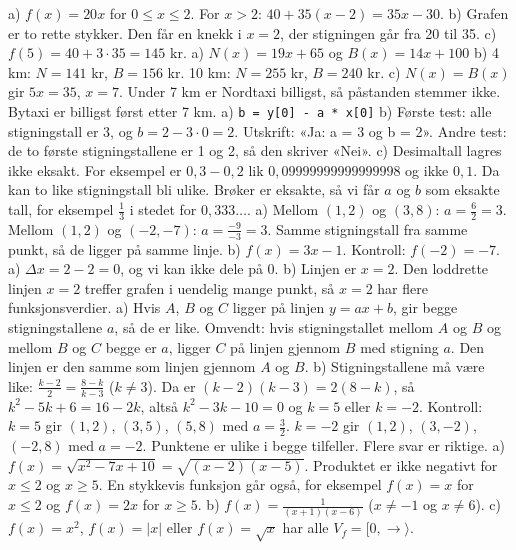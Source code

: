  a) $f(x) = 20x$ for $0 \le x \le 2$. For $x > 2$: $40 + 35(x - 2) = 35x - 30$.
b) Grafen er to rette stykker. Den får en knekk i $x = 2$, der stigningen går fra 20 til 35.
c) $f(5) = 40 + 3 \cdot 35 = 145$ kr.
 a) $N(x) = 19x + 65$ og $B(x) = 14x + 100$
b) 4 km: $N = 141$ kr, $B = 156$ kr. 10 km: $N = 255$ kr, $B = 240$ kr.
c) $N(x) = B(x)$ gir $5x = 35$, $x = 7$. Under 7 km er Nordtaxi billigst, så påstanden stemmer ikke. Bytaxi er billigst først etter 7 km.
 a) \lstinline[style=laereverk,numbers=none,frame=none]|b = y[0] - a * x[0]|
b) Første test: alle stigningstall er 3, og $b = 2 - 3 \cdot 0 = 2$. Utskrift: «Ja: a = 3 og b = 2». Andre test: de to første stigningstallene er 1 og 2, så den skriver «Nei».
c) Desimaltall lagres ikke eksakt. For eksempel er $0{,}3 - 0{,}2$ lik $0{,}09999999999999998$ og ikke $0{,}1$. Da kan to like stigningstall bli ulike. Brøker er eksakte, så vi får $a$ og $b$ som eksakte tall, for eksempel $\frac{1}{3}$ i stedet for $0{,}333\ldots$.
 a) Mellom $(1, 2)$ og $(3, 8)$: $a = \frac{6}{2} = 3$. Mellom $(1, 2)$ og $(-2, -7)$: $a = \frac{-9}{-3} = 3$. Samme stigningstall fra samme punkt, så de ligger på samme linje.
b) $f(x) = 3x - 1$. Kontroll: $f(-2) = -7$.
 a) $\Delta x = 2 - 2 = 0$, og vi kan ikke dele på 0.
b) Linjen er $x = 2$. Den loddrette linjen $x = 2$ treffer grafen i uendelig mange punkt, så $x = 2$ har flere funksjonsverdier.
 a) Hvis $A$, $B$ og $C$ ligger på linjen $y = ax + b$, gir begge stigningstallene $a$, så de er like. Omvendt: hvis stigningstallet mellom $A$ og $B$ og mellom $B$ og $C$ begge er $a$, ligger $C$ på linjen gjennom $B$ med stigning $a$. Den linjen er den samme som linjen gjennom $A$ og $B$.
b) Stigningstallene må være like: $\frac{k-2}{2} = \frac{8-k}{k-3}$ ($k \neq 3$). Da er $(k-2)(k-3) = 2(8-k)$, så $k^2 - 5k + 6 = 16 - 2k$, altså $k^2 - 3k - 10 = 0$ og $k = 5$ eller $k = -2$.
Kontroll: $k = 5$ gir $(1,2)$, $(3,5)$, $(5,8)$ med $a = \frac{3}{2}$. $k = -2$ gir $(1,2)$, $(3,-2)$, $(-2,8)$ med $a = -2$. Punktene er ulike i begge tilfeller.
 Flere svar er riktige.
a) $f(x) = \sqrt{x^2 - 7x + 10} = \sqrt{(x-2)(x-5)}$. Produktet er ikke negativt for $x \le 2$ og $x \ge 5$. En stykkevis funksjon går også, for eksempel $f(x) = x$ for $x \le 2$ og $f(x) = 2x$ for $x \ge 5$.
b) $f(x) = \frac{1}{(x+1)(x-6)}$ ($x \neq -1$ og $x \neq 6$).
c) $f(x) = x^2$, $f(x) = |x|$ eller $f(x) = \sqrt{x}$ har alle $V_f = [0, \rightarrow\rangle$.
